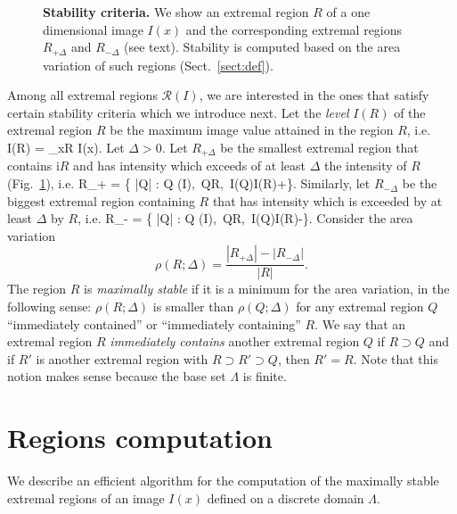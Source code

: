 \documentclass{article}
\begin{document}
\begin{figure}[ht!]
\begin{center}

\end{center}
\caption{{\bf Stability criteria.} We show an extremal region $R$ of a one dimensional image $I(x)$ and the corresponding extremal regions $R_{+\Delta}$ and $R_{-\Delta}$ (see text). Stability is computed based on the area variation of such regions (Sect.~\ref{sect:def}).}\label{fig:stab}
\end{figure}

 Among all extremal regions $\mathcal{R}(I)$, we are interested in the ones that satisfy certain stability criteria which we introduce next. Let the {\em level} $I(R)$ of the extremal region $R$ be the maximum image value attained in the region $R$, i.e.
\be\label{eq:level}
  I(R) = \sup_{x\in R} I(x).
\ee
Let $\Delta >0$. Let $R_{+\Delta}$ be the smallest extremal region that contains i$R$ and has intensity which exceeds of at least $\Delta$ the intensity of $R$ (Fig.~\ref{fig:stab}), i.e.
\be\label{eq:rplus}
 R_{+\Delta} = \argmin \{ |Q| : Q \in {}(I),\ Q\supset R,\ I(Q)\geq I(R)+\Delta \}.
\ee
Similarly, let $R_{-\Delta}$ be the biggest extremal region containing $R$ that has intensity which is exceeded by at least $\Delta$ by $R$, i.e.
\be\label{eq:rminus}
 R_{-\Delta} = \argmax \{ |Q| : Q \in {}(I),\ Q\subset R,\ I(Q)\leq I(R)-\Delta \}.
\ee
Consider the area variation
\[
   \rho(R;\Delta) = \frac{|R_{+\Delta}| - |R_{-\Delta}|}{|R|}.
\]
The region $R$ is {\em maximally stable} if it is a minimum for the area variation, in the following sense: $\rho(R;\Delta)$ is smaller than $\rho(Q;\Delta)$ for any extremal region $Q$ ``immediately contained'' or ``immediately containing'' $R$. We say that an extremal region $R$ {\em immediately contains} another extremal region $Q$ if $R\supset Q$ and if $R'$ is another extremal region with $R \supset R' \supset Q$, then $R'=R$. Note that this notion makes sense because the base set $\Lambda$ is finite.

\section{Regions computation}\label{sect:comp}

We describe an efficient algorithm for the computation of the maximally stable extremal regions of an image $I(x)$ defined on a discrete domain $\Lambda$. 
\end{document}

